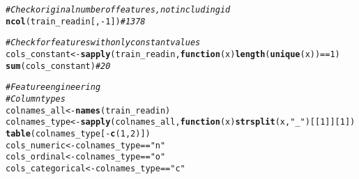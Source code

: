 \documentclass{article}\usepackage[]{graphicx}\usepackage[]{color}
\makeatletter
\newcommand{\hlnum}[1]{\textcolor[rgb]{0.686,0.059,0.569}{#1}}%
\newcommand{\hlstr}[1]{\textcolor[rgb]{0.192,0.494,0.8}{#1}}%
\newcommand{\hlcom}[1]{\textcolor[rgb]{0.678,0.584,0.686}{\textit{#1}}}%
\newcommand{\hlopt}[1]{\textcolor[rgb]{0,0,0}{#1}}%
\newcommand{\hlstd}[1]{\textcolor[rgb]{0.345,0.345,0.345}{#1}}%
\newcommand{\hlkwa}[1]{\textcolor[rgb]{0.161,0.373,0.58}{\textbf{#1}}}%
\newcommand{\hlkwb}[1]{\textcolor[rgb]{0.69,0.353,0.396}{#1}}%
\newcommand{\hlkwc}[1]{\textcolor[rgb]{0.333,0.667,0.333}{#1}}%
\newcommand{\hlkwd}[1]{\textcolor[rgb]{0.737,0.353,0.396}{\textbf{#1}}}%
\newenvironment{kframe}{%
 \def\at@end@of@kframe{}%
 \ifinner\ifhmode%
  \def\at@end@of@kframe{\end{minipage}}%
  \begin{minipage}{\columnwidth}%
 \fi\fi%
 \def\FrameCommand##1{\hskip\@totalleftmargin \hskip-\fboxsep
 \colorbox{shadecolor}{##1}\hskip-\fboxsep
     \hskip-\linewidth \hskip-\@totalleftmargin \hskip\columnwidth}%
 \MakeFramed {\advance\hsize-\width
   \@totalleftmargin\z@ \linewidth\hsize
   \@setminipage}}%
 {\par\unskip\endMakeFramed%
 \at@end@of@kframe}
\newenvironment{knitrout}{}{} %
\makeatother
\begin{document}
\begin{knitrout}
\begin{kframe}
\begin{alltt}
\hlcom{# Check original number of features, not including id}
\hlkwd{ncol}\hlstd{(train_readin[,} \hlopt{-}\hlnum{1}\hlstd{])} \hlcom{# 1378}

\hlcom{# Check for features with only constant values}
\hlstd{cols_constant} \hlkwb{<-} \hlkwd{sapply}\hlstd{(train_readin,} \hlkwa{function}\hlstd{(}\hlkwc{x}\hlstd{)} \hlkwd{length}\hlstd{(}\hlkwd{unique}\hlstd{(x))} \hlopt{==} \hlnum{1}\hlstd{)}
\hlkwd{sum}\hlstd{(cols_constant)} \hlcom{# 20}

\hlcom{# Feature engineering}
\hlcom{# Column types}
\hlstd{colnames_all} \hlkwb{<-} \hlkwd{names}\hlstd{(train_readin)}
\hlstd{colnames_type} \hlkwb{<-} \hlkwd{sapply}\hlstd{(colnames_all,} \hlkwa{function}\hlstd{(}\hlkwc{x}\hlstd{)} \hlkwd{strsplit}\hlstd{(x,} \hlstr{"_"}\hlstd{)[[}\hlnum{1}\hlstd{]][}\hlnum{1}\hlstd{])}
\hlkwd{table}\hlstd{(colnames_type[}\hlopt{-}\hlkwd{c}\hlstd{(}\hlnum{1}\hlstd{,} \hlnum{2}\hlstd{)])}
\hlstd{cols_numeric} \hlkwb{<-} \hlstd{colnames_type} \hlopt{==} \hlstr{"n"}
\hlstd{cols_ordinal} \hlkwb{<-} \hlstd{colnames_type} \hlopt{==} \hlstr{"o"}
\hlstd{cols_categorical} \hlkwb{<-} \hlstd{colnames_type} \hlopt{==} \hlstr{"c"}


\end{alltt}
\end{kframe}
\end{knitrout}
\end{document}
